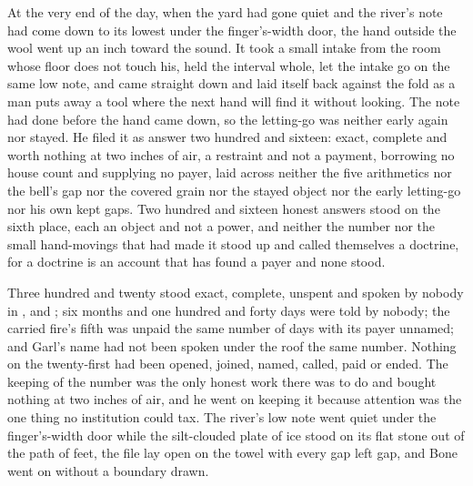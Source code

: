 At the very end of the day, when the yard had gone quiet and the river's note had come down to its lowest under the finger's-width door, the hand outside the wool went up an inch toward the sound. It took a small intake from the room whose floor does not touch his, held the interval whole, let the intake go on the same low note, and came straight down and laid itself back against the fold as a man puts away a tool where the next hand will find it without looking. The note had done before the hand came down, so the letting-go was neither early again nor stayed. He filed it as answer two hundred and sixteen: exact, complete and worth nothing at two inches of air, a restraint and not a payment, borrowing no house count and supplying no payer, laid across neither the five arithmetics nor the bell's gap nor the covered grain nor the stayed object nor the early letting-go nor his own kept gaps. Two hundred and sixteen honest answers stood on the sixth place, each an object and not a power, and neither the number nor the small hand-movings that had made it stood up and called themselves a doctrine, for a doctrine is an account that has found a payer and none stood.

Three hundred and twenty stood exact, complete, unspent and spoken by nobody in ,  and ; six months and one hundred and forty days were told by nobody; the carried fire's fifth was unpaid the same number of days with its payer unnamed; and Garl's name had not been spoken under the roof the same number. Nothing on the twenty-first had been opened, joined, named, called, paid or ended. The keeping of the number was the only honest work there was to do and bought nothing at two inches of air, and he went on keeping it because attention was the one thing no institution could tax. The river's low note went quiet under the finger's-width door while the silt-clouded plate of ice stood on its flat stone out of the path of feet, the file lay open on the towel with every gap left gap, and Bone went on without a boundary drawn.
